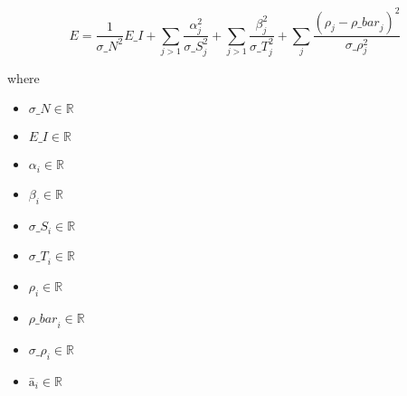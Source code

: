 \documentclass[12pt]{article}
\begin{document}
\[
\textit{E} = \frac{1}{\textit{σ\_N}^{2}}\textit{E\_I} + \sum_{\textit{j} > 1} \frac{\textit{α}_{ \textit{j} }^{2}}{\textit{σ\_S}_{ \textit{j} }^{2}} + \sum_{\textit{j} > 1} \frac{\textit{β}_{ \textit{j} }^{2}}{\textit{σ\_T}_{ \textit{j} }^{2}} + \sum_\textit{j} \frac{(\textit{ρ}_{ \textit{j} } - \textit{ρ\_bar}_{ \textit{j} })^{2}}{\textit{σ\_ρ}_{ \textit{j} }^{2}}
\]

where
\begin{itemize}
\item $\textit{σ\_N} \in \mathbb{{R}}$
\item $\textit{E\_I} \in \mathbb{{R}}$
\item $\textit{α}_{\textit{i}} \in \mathbb{{R}}$
\item $\textit{β}_{\textit{i}} \in \mathbb{{R}}$
\item $\textit{σ\_S}_{\textit{i}} \in \mathbb{{R}}$
\item $\textit{σ\_T}_{\textit{i}} \in \mathbb{{R}}$
\item $\textit{ρ}_{\textit{i}} \in \mathbb{{R}}$
\item $\textit{ρ\_bar}_{\textit{i}} \in \mathbb{{R}}$
\item $\textit{σ\_ρ}_{\textit{i}} \in \mathbb{{R}}$
\item $\textit{ā}_{\textit{i}} \in \mathbb{{R}}$
\end{itemize}
\end{document}
